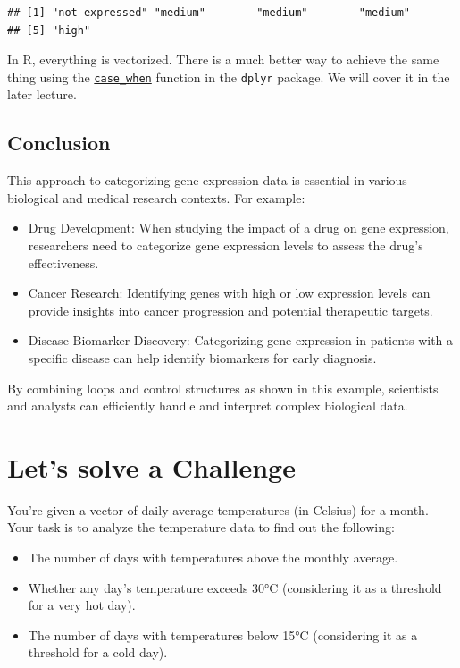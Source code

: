 \documentclass[
]{book}
\begin{document}
\begin{verbatim}
## [1] "not-expressed" "medium"        "medium"        "medium"       
## [5] "high"
\end{verbatim}

In R, everything is vectorized. There is a much better way to achieve the same thing using the \href{https://dplyr.tidyverse.org/reference/case_when.html}{\texttt{case\_when}} function in the \texttt{dplyr} package. We will cover it in the later lecture.

\hypertarget{conclusion-8}{%
\subsection{Conclusion}\label{conclusion-8}}

This approach to categorizing gene expression data is essential in various biological and medical research contexts. For example:

\begin{itemize}
\item
  Drug Development: When studying the impact of a drug on gene expression, researchers need to categorize gene expression levels to assess the drug's effectiveness.
\item
  Cancer Research: Identifying genes with high or low expression levels can provide insights into cancer progression and potential therapeutic targets.
\item
  Disease Biomarker Discovery: Categorizing gene expression in patients with a specific disease can help identify biomarkers for early diagnosis.
\end{itemize}

By combining loops and control structures as shown in this example, scientists and analysts can efficiently handle and interpret complex biological data.

\hypertarget{lets-solve-a-challenge}{%
\section{Let's solve a Challenge}\label{lets-solve-a-challenge}}

You're given a vector of daily average temperatures (in Celsius) for a month. Your task is to analyze the temperature data to find out the following:

\begin{itemize}
\item
  The number of days with temperatures above the monthly average.
\item
  Whether any day's temperature exceeds 30°C (considering it as a threshold for a very hot day).
\item
  The number of days with temperatures below 15°C (considering it as a threshold for a cold day).
\end{itemize}
\end{document}
